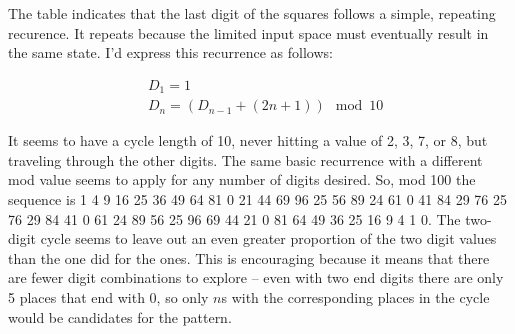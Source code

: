 The table indicates that the last digit of the squares follows a simple, repeating recurence.  It repeats because
the limited input space must eventually result in the same state.  I'd express this recurrence as follows:

\begin{align*}
&D_1 = 1 \\
&D_n = (D_{n - 1} + (2n + 1)) \mod 10
\end{align*}

It seems to have a cycle length of 10, never hitting a value of 2, 3, 7, or 8, but traveling through the other digits.
The same basic recurrence with a different mod value seems to apply for any number of digits desired.  So, mod 100
the sequence is 1 4 9 16 25 36 49 64 81 0 21 44 69 96 25 56 89 24 61 0 41 84 29 76 25 76 29 84 41 0 61 24 89 56 25 96
 69 44 21 0 81 64 49 36 25 16 9 4 1 0.  The two-digit cycle seems to leave out an even greater proportion of the
 two digit values than the one did for the ones.  This is encouraging because it means that there are fewer digit
 combinations to explore -- even with two end digits there are only 5 places that end with 0, so only $n$s with the
 corresponding places in the cycle would be candidates for the pattern.